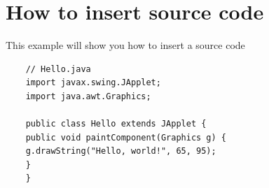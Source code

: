 \chapter{How to insert source code}
This example will show you how to insert a source code
\begin{lstlisting}
    // Hello.java
    import javax.swing.JApplet;
    import java.awt.Graphics;

    public class Hello extends JApplet {
    public void paintComponent(Graphics g) {
    g.drawString("Hello, world!", 65, 95);
    }
    }
\end{lstlisting}

